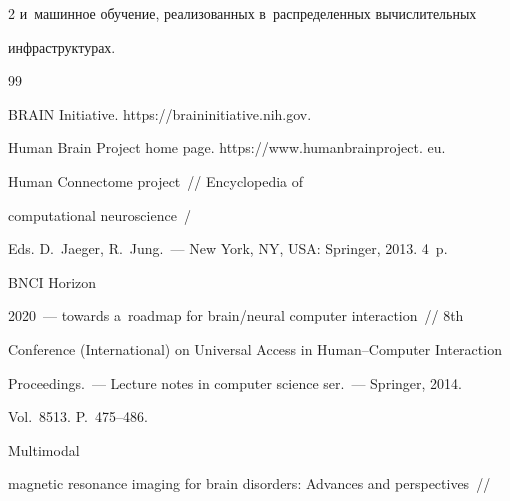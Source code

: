 \begin{multicols}{2}
и~машинное обучение, реализованных в~распределенных вычислительных 


инфраструктурах.





\vspace*{-6pt}








{\small\frenchspacing


 {%




 \begin{thebibliography}{99}


 


 \vspace*{-3pt}


 




  BRAIN Initiative. {\sf https://braininitiative.nih.gov}.




  Human Brain Project home page. {\sf https://www.\linebreak humanbrainproject. eu}.




   Human Connectome project~// Encyclopedia of 


computational neuroscience~/


Eds. D.~Jaeger, R.~Jung.~--- New York, NY, USA: Springer, 2013. 4~p.




   BNCI Horizon  


2020~--- towards a~roadmap for brain/neural computer interaction~// 8th 


Conference (International) on Universal Access in Human--Computer Interaction 


Proceedings.~--- Lecture notes in computer science ser.~--- Springer, 2014. 


Vol.~8513. P.~475--486. 




   Multimodal 


magnetic resonance imaging for brain disorders: Advances and perspectives~// 



\end{thebibliography}}}
\end{multicols}
